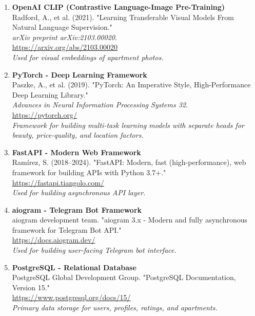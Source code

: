 \documentclass[12pt,a4paper]{article}
\begin{document}
\begin{enumerate}
    \item \textbf{OpenAI CLIP (Contrastive Language-Image Pre-Training)}\\
    Radford, A., et al. (2021). "Learning Transferable Visual Models From Natural Language Supervision." \\
    \textit{arXiv preprint arXiv:2103.00020}.\\
    \url{https://arxiv.org/abs/2103.00020}\\
    \textit{Used for visual embeddings of apartment photos.}
    
    \item \textbf{PyTorch - Deep Learning Framework}\\
    Paszke, A., et al. (2019). "PyTorch: An Imperative Style, High-Performance Deep Learning Library." \\
    \textit{Advances in Neural Information Processing Systems 32}.\\
    \url{https://pytorch.org/}\\
    \textit{Framework for building multi-task learning models with separate heads for beauty, price-quality, and location factors.}
    
    \item \textbf{FastAPI - Modern Web Framework}\\
    Ramírez, S. (2018--2024). "FastAPI: Modern, fast (high-performance), web framework for building APIs with Python 3.7+."\\
    \url{https://fastapi.tiangolo.com/}\\
    \textit{Used for building asynchronous API layer.}
    
    \item \textbf{aiogram - Telegram Bot Framework}\\
    aiogram development team. "aiogram 3.x - Modern and fully asynchronous framework for Telegram Bot API."\\
    \url{https://docs.aiogram.dev/}\\
    \textit{Used for building user-facing Telegram bot interface.}
    
    \item \textbf{PostgreSQL - Relational Database}\\
    PostgreSQL Global Development Group. "PostgreSQL Documentation, Version 15."\\
    \url{https://www.postgresql.org/docs/15/}\\
    \textit{Primary data storage for users, profiles, ratings, and apartments.}
\end{enumerate}
\end{document}
